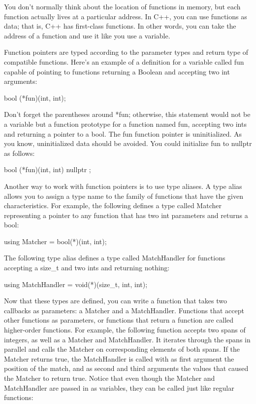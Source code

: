
You don’t normally think about the location of functions in memory, but each function actually lives at a particular address. In C++, you can use functions as data; that is, C++ has first-class functions. In other words, you can take the address of a function and use it like you use a variable.

Function pointers are typed according to the parameter types and return type of compatible functions. Here’s an example of a definition for a variable called fun capable of pointing to functions returning a Boolean and accepting two int arguments:

\begin{cpp}
bool (*fun)(int, int);
\end{cpp}

Don’t forget the parentheses around *fun; otherwise, this statement would not be a variable but a function prototype for a function named fun, accepting two ints and returning a pointer to a bool. The fun function pointer is uninitialized. As you know, uninitialized data should be avoided. You could initialize fun to nullptr as follows:

\begin{cpp}
bool (*fun)(int, int) { nullptr };
\end{cpp}


Another way to work with function pointers is to use type aliases. A type alias allows you to assign a type name to the family of functions that have the given characteristics. For example, the following defines a type called Matcher representing a pointer to any function that has two int parameters and returns a bool:

\begin{cpp}
using Matcher = bool(*)(int, int);
\end{cpp}

The following type alias defines a type called MatchHandler for functions accepting a size\_t and two ints and returning nothing:

\begin{cpp}
using MatchHandler = void(*)(size_t, int, int);
\end{cpp}

Now that these types are defined, you can write a function that takes two callbacks as parameters: a Matcher and a MatchHandler. Functions that accept other functions as parameters, or functions that return a function are called higher-order functions. For example, the following function accepts two spans of integers, as well as a Matcher and MatchHandler. It iterates through the spans in parallel and calls the Matcher on corresponding elements of both spans. If the Matcher returns true, the MatchHandler is called with as first argument the position of the match, and as second and third arguments the values that caused the Matcher to return true. Notice that even though the Matcher and MatchHandler are passed in as variables, they can be called just like regular functions:


